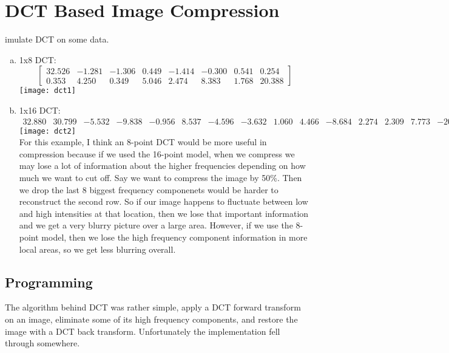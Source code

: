 \documentclass[12pt]{article}
\newenvironment{question}[2][Question]{\begin{trivlist}
\item[\hskip \labelsep{\bfseries #1}\hskip \labelsep{\bfseries #2.}]}{\end{trivlist}}
\begin{document}
\section{DCT Based Image Compression}

\setcounter{MaxMatrixCols}{20}
\begin{question}[1]
Simulate DCT on some data.
\begin{enumerate}[(a)]
  \item 1x8 DCT: \[
\begin{bmatrix}
 32.526 &
 -1.281&  
 -1.306&
  0.449&
 -1.414&
 -0.300&
  0.541&
  0.254\\
 0.353 & 
 4.250 &
 0.349 &
 5.046 &
 2.474 &
 8.383 &
 1.768 &
20.388

\end{bmatrix}
\]
\texttt{[image: dct1]}\\
\item 1x16 DCT:
\[
\begin{smallmatrix}
 32.880 & 
 30.799 &
 -5.532 &
 -9.838 &
 -0.956 &
  8.537 &
 -4.596 &
 -3.632 &
  1.060 &
  4.466 &
 -8.684 &
  2.274 &
  2.309 &
  7.773 &
-20.133 &
 19.182

\end{smallmatrix}
\]
\texttt{[image: dct2]}\\
For this example, I think an 8-point DCT would be more useful in compression
because if we used the 16-point model, when we compress we may lose a lot of
information about the higher frequencies depending on how much we want to cut off. Say we
want to compress the image by 50\%. Then we drop the last 8 biggest frequency componenets
would be harder to reconstruct the second row. So if our image happens to
fluctuate between low and high intensities at that location, then we lose that
important information and we get a very blurry picture over a large area.
However, if we use the 8-point model, then we lose the high frequency component
information in more local areas, so we get less blurring overall.
\end{enumerate}
\end{question}

\subsection{Programming}

The algorithm behind DCT was rather simple, apply a DCT forward transform on an
image, eliminate some of its high frequency components, and restore the image
with a DCT back transform. Unfortunately the implementation fell through
somewhere.
\end{document}
